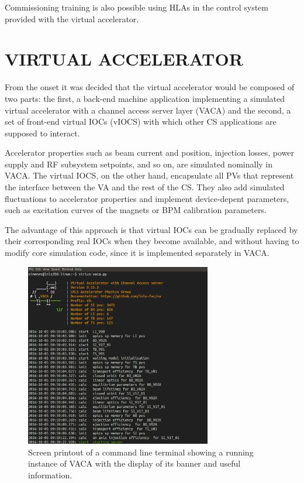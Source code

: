 \documentclass[a4paper,
              ]{jacow}
\begin{document}
Commissioning training is also possible using HLAs in the control system provided with the virtual accelerator.

\section{VIRTUAL ACCELERATOR}

From the onset it was decided that the virtual accelerator would be composed of two parts: the first, a back-end machine
application implementing a simulated virtual accelerator with a channel access server layer (VACA) and the second, a set of
front-end virtual IOCs (vIOCS) with which other CS applications are supposed to interact.

Accelerator properties such as beam current and position, injection losses, power supply and RF subsystem setpoints,
and so on, are simulated nominally in VACA. 
The virtual IOCS, on the other hand, encapsulate all PVs that represent the interface between the VA and the rest of the CS. 
They also add simulated fluctuations to accelerator properties and implement device-depent parameters, such as excitation curves of the magnets or BPM calibration parameters.

The advantage of this approach is that virtual IOCs can be gradually replaced by their corresponding real IOCs when they become
available, and without having to modify core simulation code, since it is implemented separately in VACA.

\begin{figure}[!htb]
   \centering
   \includegraphics*[width=230pt]{WEPOPRPO21f1}
   \caption{Screen printout of a command line terminal showing a running instance of VACA with the display of its banner and useful information.}
   \label{fig:screen_print}
\end{figure}
\end{document}

